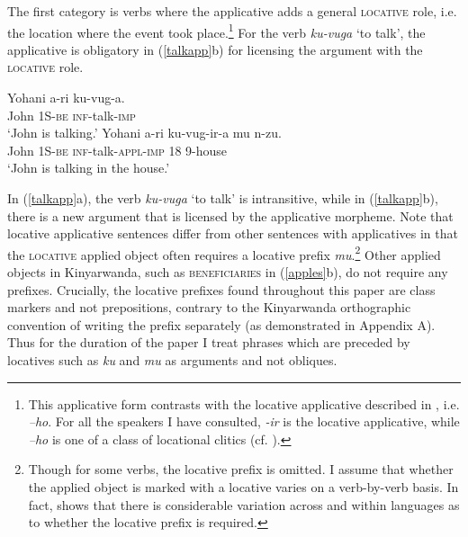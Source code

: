 \documentclass[output=paper]{langsci/langscibook}
\begin{document}
The first category is verbs where the applicative adds a general {\scshape locative} role, i.e. the location where the event took place.\footnote{This applicative form contrasts with the locative applicative described in \citet{kimenyi:1980,zeller:2006,zellerngoboka:2006}, i.e. \emph{--ho}. For all the speakers I have consulted, \emph{-ir} is the locative applicative, while \emph{--ho} is one of a class of locational clitics (cf. ).} For the verb \emph{ku-vuga} `to talk', the applicative is obligatory in (\ref{talkapp}b) for licensing the argument with the {\scshape locative} role. 
	\begin{exe}
		\ex\label{talkapp}\begin{xlist}
		\ex\gll Yohani a-ri ku-vug-a.\\	
				John 1S-{\scshape be} {\scshape inf}-talk-{\scshape imp}\\
				\glt `John is talking.'
		\ex\gll Yohani a-ri ku-vug-ir-a mu n-zu.\\
			John 1S-{\scshape be} {\scshape inf}-talk-{\scshape appl-imp} 18 9-house\\
				\glt `John is talking in the house.'
	\end{xlist}
	\end{exe}
 In (\ref{talkapp}a), the verb \emph{ku-vuga} `to talk' is intransitive, while in (\ref{talkapp}b), there is a new argument that is licensed by the applicative morpheme. Note that locative applicative sentences differ from other sentences with applicatives in that the {\scshape locative} applied object often requires a locative prefix \emph{mu}.\footnote{Though for some verbs, the locative prefix is omitted. I assume that whether the applied object is marked with a locative varies on a verb-by-verb basis. In fact, \citet{rugemalira:2003} shows that there is considerable variation across and within languages as to whether the locative prefix is required.} Other applied objects in Kinyarwanda, such as {\scshape beneficiaries} in (\ref{apples}b), do not require any prefixes. Crucially, the locative prefixes found throughout this paper are class markers and not prepositions, contrary to the Kinyarwanda orthographic convention of writing the prefix separately (as demonstrated in Appendix A). Thus for the duration of the paper I treat phrases which are preceded by locatives such as \emph{ku} and \emph{mu} as arguments and not obliques.  
\end{document}

